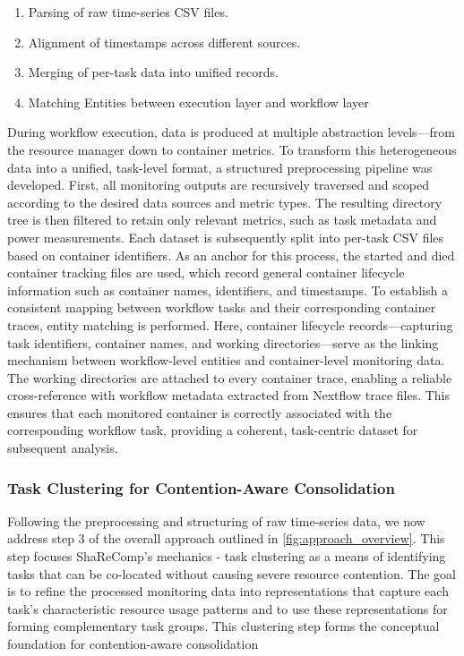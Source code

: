 \begin{enumerate}
    \item Parsing of raw time-series CSV files.
    \item Alignment of timestamps across different sources.
    \item Merging of per-task data into unified records.
    \item Matching Entities between execution layer and workflow layer
\end{enumerate}

During workflow execution, data is produced at multiple abstraction levels—from the resource manager down to container metrics. To transform this heterogeneous data into a unified, task-level format, a structured preprocessing pipeline was developed. First, all monitoring outputs are recursively traversed and scoped according to the desired data sources and metric types. The resulting directory tree is then filtered to retain only relevant metrics, such as task metadata and power measurements. Each dataset is subsequently split into per-task CSV files based on container identifiers.
As an anchor for this process, the started and died container tracking files are used, which record general container lifecycle information such as container names, identifiers, and timestamps. To establish a consistent mapping between workflow tasks and their corresponding container traces, entity matching is performed. Here, container lifecycle records—capturing task identifiers, container names, and working directories—serve as the linking mechanism between workflow-level entities and container-level monitoring data. The working directories are attached to every container trace, enabling a reliable cross-reference with workflow metadata extracted from Nextflow trace files. This ensures that each monitored container is correctly associated with the corresponding workflow task, providing a coherent, task-centric dataset for subsequent analysis.

\subsubsection{Task Clustering for Contention-Aware Consolidation}
\label{sec:task_clustering}

Following the preprocessing and structuring of raw time-series data, we now address step 3 of the overall approach outlined in \ref{fig:approach_overview}. This step focuses ShaReComp's mechanics - task clustering as a means of identifying tasks that can be co-located without causing severe resource contention. The goal is to refine the processed monitoring data into representations that capture each task's characteristic resource usage patterns and to use these representations for forming complementary task groups. This clustering step forms the conceptual foundation for contention-aware consolidation

